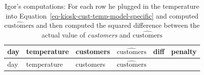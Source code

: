 \documentclass[
  12pt,
  letterpaper,
  DIV=11,
  numbers=noendperiod]{scrreprt}
\begin{document}
\begin{longtable}[]{@{}
  >{\raggedright\arraybackslash}p{}
  >{\raggedleft\arraybackslash}p{}
  >{\raggedleft\arraybackslash}p{}
  >{\raggedleft\arraybackslash}p{}
  >{\raggedleft\arraybackslash}p{}
  >{\raggedleft\arraybackslash}p{}@{}}
\caption{Igor's computations: For each row he plugged in the temperature
into Equation~\ref{eq-kiosk-cust-temp-model-specific} and computed
\(\widehat{\text{customers}}\) and then computed the squared difference
between the actual value of \emph{customers} and
\(\widehat{\text{customers}}\)}\label{tbl-igor-computations-for-15-2}\tabularnewline
\toprule\noalign{}
\begin{minipage}[b]{\linewidth}\raggedright
day
\end{minipage} & \begin{minipage}[b]{\linewidth}\raggedleft
temperature
\end{minipage} & \begin{minipage}[b]{\linewidth}\raggedleft
customers
\end{minipage} & \begin{minipage}[b]{\linewidth}\raggedleft
\(\widehat{\text{customers}}\)
\end{minipage} & \begin{minipage}[b]{\linewidth}\raggedleft
diff
\end{minipage} & \begin{minipage}[b]{\linewidth}\raggedleft
penalty
\end{minipage} \\
\midrule\noalign{}
\endfirsthead
\toprule\noalign{}
\begin{minipage}[b]{\linewidth}\raggedright
day
\end{minipage} & \begin{minipage}[b]{\linewidth}\raggedleft
temperature
\end{minipage} & \begin{minipage}[b]{\linewidth}\raggedleft
customers
\end{minipage} & \begin{minipage}[b]{\linewidth}\raggedleft
\(\widehat{\text{customers}}\)
\end{minipage} & \begin{minipage}[b]{\linewidth}\raggedleft

\end{minipage}
\end{longtable}
\end{document}
